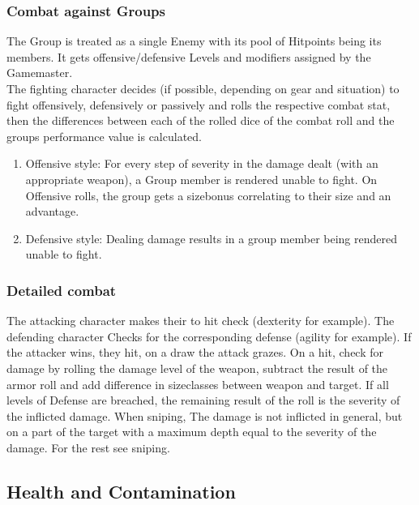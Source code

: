 \documentclass{article}
\begin{document}
    \subsubsection{Combat against Groups}
    The Group is treated as a single Enemy with its pool of Hitpoints being its members.
    It gets offensive/defensive Levels and modifiers assigned by the Gamemaster.\\

    The fighting character decides (if possible, depending on gear and situation) to fight offensively, defensively
    or passively and rolls the respective combat stat, then the differences between each of the rolled dice of the combat
    roll and the groups performance value is calculated.\par
    \begin{enumerate}[label= - ]

        \item Offensive style: For every step of severity in the damage dealt (with an appropriate weapon),
        a Group member is rendered unable to
        fight. On Offensive rolls, the group gets a sizebonus correlating to their size and an advantage.\\

        \item Defensive style: Dealing damage results in a group member being rendered unable to fight.\\
    \end{enumerate}

    \subsubsection{Detailed combat}
    The attacking character makes their to hit check (dexterity for example). The defending character Checks for the
    corresponding defense (agility for example). If the attacker wins, they hit, on a draw the
    attack grazes. On a hit, check for damage by rolling the damage level of the weapon, subtract the result of the
    armor roll and add difference in sizeclasses between weapon and target.
    If all levels of Defense are breached, the remaining result of the roll is the severity of the inflicted damage.\newline
    When sniping, The damage is not inflicted in general, but on a part of the target with a maximum depth equal to
    the severity of the damage. For the rest see sniping.

    \subsection{Health and Contamination}
\end{document}
